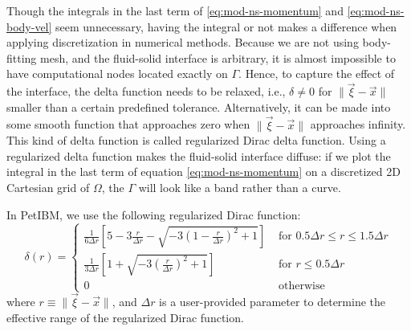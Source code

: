 Though the integrals in the last term of \eqref{eq:mod-ns-momentum} and \eqref{eq:mod-ns-body-vel} seem unnecessary, having the integral or not makes a difference when applying discretization in numerical methods.
Because we are not using body-fitting mesh, and the fluid-solid interface is arbitrary, it is almost impossible to have computational nodes located exactly on $\Gamma$.
Hence, to capture the effect of the interface, the delta function needs to be relaxed, i.e., $\delta \ne 0$ for $\lVert \vec{\xi}-\vec{x} \rVert$ smaller than a certain predefined tolerance.
Alternatively, it can be made into some smooth function that approaches zero when $\lVert \vec{\xi}-\vec{x} \rVert$ approaches infinity.
This kind of delta function is called regularized Dirac delta function.
Using a regularized delta function makes the fluid-solid interface diffuse: if we plot the integral in the last term of equation \eqref{eq:mod-ns-momentum} on a discretized 2D Cartesian grid of $\Omega$, the $\Gamma$ will look like a band rather than a curve.

In PetIBM, we use the following regularized Dirac function:
\begin{equation}\label{eq:regularized-dirac}
    \delta\left(r\right)=\left\{
        \begin{array}{ll}
            \frac{1}{6 \Delta r}\left[
                5-3 \frac{r}{\Delta r}-\sqrt{-3\left(1-\frac{r}{\Delta r}\right)^{2}+1}
            \right] & \text { for } 0.5 \Delta r \le r \le 1.5 \Delta r \\
            \frac{1}{3 \Delta r}\left[
                1+\sqrt{-3\left(\frac{r}{\Delta r}\right)^{2}+1}
            \right] & \text { for }r \le 0.5 \Delta r \\
            0 & \text { otherwise }
        \end{array}
    \right.
\end{equation}
where $r \equiv \lVert\vec{\xi}-\vec{x}\rVert$, and $\Delta r$ is a user-provided parameter to determine the effective range of the regularized Dirac function.

